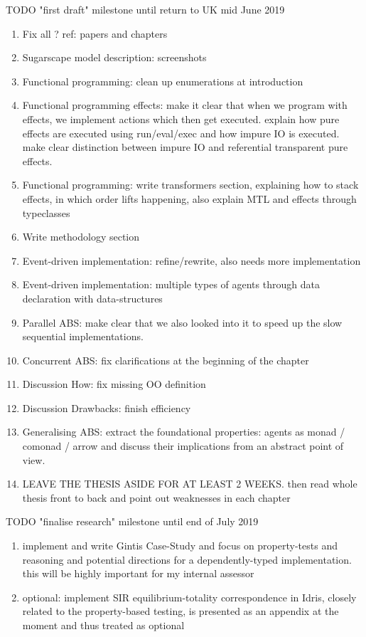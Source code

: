 \documentclass[oneside]{book}
\begin{document}
TODO "first draft" milestone until return to UK mid June 2019
\begin{enumerate}
	\item Fix all ? ref: papers and chapters
	\item Sugarscape model description: screenshots
	\item Functional programming: clean up enumerations at introduction
	\item Functional programming effects: make it clear that when we program with effects, we implement actions which then get executed. explain how pure effects are executed using run/eval/exec and how impure IO is executed. make clear distinction between impure IO and referential transparent pure effects. 
	\item Functional programming: write transformers section, explaining how to stack effects, in which order lifts happening, also explain MTL and effects through typeclasses
	\item Write methodology section
	\item Event-driven implementation: refine/rewrite, also needs more implementation
	\item Event-driven implementation: multiple types of agents through data declaration with data-structures
	\item Parallel ABS: make clear that we also looked into it to speed up the slow sequential implementations.
	\item Concurrent ABS: fix clarifications at the beginning of the chapter
	\item Discussion How: fix missing OO definition
	\item Discussion Drawbacks: finish efficiency
	
	\item Generalising ABS: extract the foundational properties: agents as monad / comonad / arrow and discuss their implications from an abstract point of view.
	
	\item LEAVE THE THESIS ASIDE FOR AT LEAST 2 WEEKS. then read whole thesis front to back and point out weaknesses in each chapter
\end{enumerate}

TODO "finalise research" milestone until end of July 2019
\begin{enumerate}
	\item implement and write Gintis Case-Study and focus on property-tests and reasoning and potential directions for a dependently-typed implementation. this will be highly important for my internal assessor 

	\item optional: implement SIR equilibrium-totality correspondence in Idris, closely related to the property-based testing, is presented as an appendix at the moment and thus treated as optional
\end{enumerate}
\end{document}
